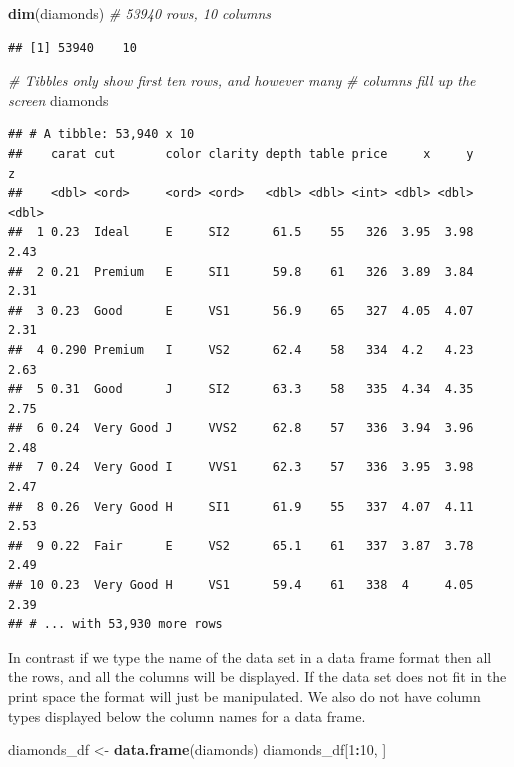 \documentclass[
]{book}
\newenvironment{Shaded}{\begin{snugshade}}{\end{snugshade}}
\newcommand{\CommentTok}[1]{\textcolor[rgb]{0.56,0.35,0.01}{\textit{#1}}}
\newcommand{\DecValTok}[1]{\textcolor[rgb]{0.00,0.00,0.81}{#1}}
\newcommand{\KeywordTok}[1]{\textcolor[rgb]{0.13,0.29,0.53}{\textbf{#1}}}
\newcommand{\NormalTok}[1]{#1}
\newcommand{\OperatorTok}[1]{\textcolor[rgb]{0.81,0.36,0.00}{\textbf{#1}}}
\newcommand{\StringTok}[1]{\textcolor[rgb]{0.31,0.60,0.02}{#1}}
\begin{document}
\begin{Shaded}
\begin{Highlighting}[]
\KeywordTok{dim}\NormalTok{(diamonds)  }\CommentTok{# 53940 rows, 10 columns }
\end{Highlighting}
\end{Shaded}

\begin{verbatim}
## [1] 53940    10
\end{verbatim}

\begin{Shaded}
\begin{Highlighting}[]
\CommentTok{# Tibbles only show first ten rows, and however many}
\CommentTok{# columns fill up the screen}
\NormalTok{diamonds}
\end{Highlighting}
\end{Shaded}

\begin{verbatim}
## # A tibble: 53,940 x 10
##    carat cut       color clarity depth table price     x     y     z
##    <dbl> <ord>     <ord> <ord>   <dbl> <dbl> <int> <dbl> <dbl> <dbl>
##  1 0.23  Ideal     E     SI2      61.5    55   326  3.95  3.98  2.43
##  2 0.21  Premium   E     SI1      59.8    61   326  3.89  3.84  2.31
##  3 0.23  Good      E     VS1      56.9    65   327  4.05  4.07  2.31
##  4 0.290 Premium   I     VS2      62.4    58   334  4.2   4.23  2.63
##  5 0.31  Good      J     SI2      63.3    58   335  4.34  4.35  2.75
##  6 0.24  Very Good J     VVS2     62.8    57   336  3.94  3.96  2.48
##  7 0.24  Very Good I     VVS1     62.3    57   336  3.95  3.98  2.47
##  8 0.26  Very Good H     SI1      61.9    55   337  4.07  4.11  2.53
##  9 0.22  Fair      E     VS2      65.1    61   337  3.87  3.78  2.49
## 10 0.23  Very Good H     VS1      59.4    61   338  4     4.05  2.39
## # ... with 53,930 more rows
\end{verbatim}

In contrast if we type the name of the data set in a data frame format then all the rows, and all the columns will be displayed. If the data set does not fit in the print space the format will just be manipulated. We also do not have column types displayed below the column names for a data frame.

\begin{Shaded}
\begin{Highlighting}[]
\NormalTok{diamonds_df <-}\StringTok{ }\KeywordTok{data.frame}\NormalTok{(diamonds)}
\NormalTok{diamonds_df[}\DecValTok{1}\OperatorTok{:}\DecValTok{10}\NormalTok{, ]}
\end{Highlighting}
\end{Shaded}
\end{document}
